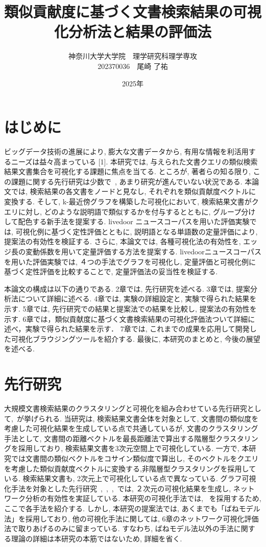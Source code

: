 \documentclass[a4paper,12pt]{jsreport}
\title{類似貢献度に基づく文書検索結果の可視化分析法と結果の評価法}
\author{神奈川大学大学院　理学研究科理学専攻 \\
202370036　尾崎 了祐}
\date{2025年}
\begin{document}
\maketitle
\tableofcontents

\chapter{はじめに}

ビッグデータ技術の進展により, 膨大な文書データから, 有用な情報を利活用するニーズは益々高まっている [1].
本研究では, 与えられた文書クエリの類似検索結果文書集合を可視化する課題に焦点を当てる. 
ところが, 著者らの知る限り, この課題に関する先行研究は少数で~\cite{oda04}, あまり研究が進んでいない状況である. 
本論文では, 検索結果の各文書をノードと見なし, それぞれを類似貢献度ベクトルに変換する. 
そして, k-最近傍グラフを構築した可視化において, 検索結果文書がクエリに対し, 
どのような説明語で類似するかを付与するとともに, グループ分けして配色する新手法を提案する. 
livedoor ニュースコーパスを用いた評価実験では, 可視化例に基づく定性評価とともに, 
説明語となる単語数の定量評価により, 提案法の有効性を検証する.
さらに, 本論文では, 各種可視化法の有効性を, エッジ長の変動係数を用いて定量評価する方法を提案する. 
livedoorニュースコーパスを用いた評価実験では, ４つの手法でグラフを可視化し, 
定量評価と可視化例に基づく定性評価を比較することで, 定量評価法の妥当性を検証する.

本論文の構成は以下の通りである. 
2章では, 先行研究を述べる.
3章では, 提案分析法について詳細に述べる. 
4章では, 実験の詳細設定と, 実験で得られた結果を示す. 
5章では, 先行研究での結果と提案法での結果を比較し, 提案法の有効性を示す.
6章では，類似貢献度に基づく文書検索結果の可視化評価法ついて詳細に述べ，実験で得られた結果を示す．
7章では, これまでの成果を応用して開発した可視化ブラウジングツールを紹介する.
最後に, 本研究のまとめと, 今後の展望を述べる. 

\newpage

\chapter{先行研究}
大規模文書検索結果のクラスタリングと可視化を組み合わせている先行研究として,~\cite{oda04}が挙げられる.
当研究は, 検索結果文書全体を対象として, 文書間の類似度を考慮した可視化結果を生成している点で共通しているが,
文書のクラスタリング手法として, 文書間の距離ベクトルを最長距離法で算出する階層型クラスタリングを採用しており,
検索結果文書を3次元空間上で可視化している.
一方で, 本研究では文書間の類似ベクトルをコサイン類似度で算出し,
そのベクトルをクエリを考慮した類似貢献度ベクトルに変換する,非階層型クラスタリングを採用している. 
検索結果文書も, 2次元上で可視化している点で異なっている.
グラフ可視化手法を対象とした先行研究~\cite{saito},~\cite{YST},~\cite{BETT},~\cite{C}では, 
２次元の可視化結果を生成し, ネットワーク分析の有効性を実証している.
本研究の可視化手法では, ~\cite{saito}を採用するため,ここで各手法を紹介する. 
しかし, 本研究の提案法では, あくまでも「ばねモデル法」を採用しており,
他の可視化手法に関しては, 6章のネットワーク可視化評価法で取りあげるのみに留まっている.
すなわち, ばねモデル法以外の手法に関する理論の詳細は本研究の本筋ではないため, 詳細を省く.
\end{document}
